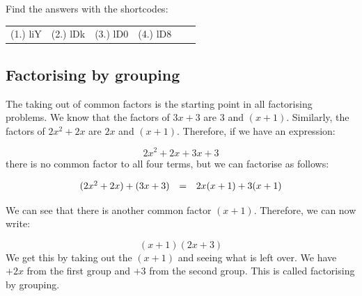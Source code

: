 \begin{exercises}{}
{\begin{enumerate}[itemsep=5pt, label=\textbf{\arabic*}. ]
\end{enumerate}
\practiceinfo 
\par {} Find the answers with the shortcodes:
 \par \begin{tabular}[h]{cccccc}
 (1.) liY  &  (2.) lDk  &  (3.) lD0  &  (4.) lD8  & \end{tabular}
}
\end{exercises} 


\subsection{Factorising by grouping}

The taking out of common factors is the starting point in all factorising problems. We know that the factors of $3x+3$  are $3$ and $(x+1)$. Similarly, the factors of $2{x}^{2}+2x$ are $2x$ and $(x+1)$. Therefore, if we have an expression:\par 

\begin{equation*}
2{x}^{2}+2x+3x+3
\end{equation*}
there is no common factor to all four terms, but we can factorise as follows:


\begin{equation*}
\begin{array}{ccl}
(2{x}^{2}+2x)+(3x+3) &=& 2x(x+1)+3(x+1) \hfill \hfill
\end{array}
\end{equation*}


We can see that there is another common factor $(x+1)$. Therefore, we can now write:\par 
\begin{equation*}
(x+1)(2x+3)
\end{equation*}
We get this by taking out the $(x+1)$ and seeing what is left over. We have $+2x$ from the first group and $+3$ from the second group. This is called factorising by grouping.\par 



